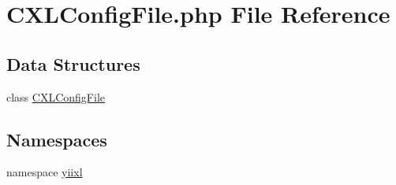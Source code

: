 \hypertarget{CXLConfigFile_8php}{
\section{CXLConfigFile.php File Reference}
\label{CXLConfigFile_8php}
}
\subsection*{Data Structures}
\begin{DoxyCompactItemize}
\item 
class \hyperlink{classCXLConfigFile}{CXLConfigFile}
\end{DoxyCompactItemize}
\subsection*{Namespaces}
\begin{DoxyCompactItemize}
\item 
namespace \hyperlink{namespaceyiixl}{yiixl}
\end{DoxyCompactItemize}
